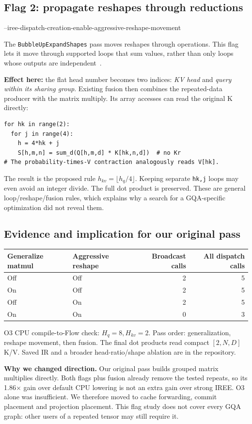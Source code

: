 \documentclass[10pt,a4paper]{article}
\newcommand{\code}[1]{\texttt{#1}}
\newcommand{\smallnote}[1]{{\footnotesize #1\par}}
\begin{document}
\subsection*{Flag 2: propagate reshapes through reductions}
{\footnotesize\ttfamily --iree-dispatch-creation-enable-aggressive-reshape-movement\par}
The \code{BubbleUpExpandShapes} pass moves reshapes through operations. This flag lets it move through supported loops that sum values, rather than only loops whose outputs are independent~\cite{ireesource,ireedocs}.

\textbf{Effect here:} the flat head number becomes two indices: \emph{KV head} and \emph{query within its sharing group}. Existing fusion then combines the repeated-data producer with the matrix multiply. Its array accesses can read the original K directly:
\begin{lstlisting}
for hk in range(2):
  for j in range(4):
    h = 4*hk + j
    S[h,m,n] = sum_d(Q[h,m,d] * K[hk,n,d])  # no Kr
# The probability-times-V contraction analogously reads V[hk].
\end{lstlisting}
The result is the proposed rule $h_{kv}=\lfloor h_q/4\rfloor$. Keeping separate \code{hk,j} loops may even avoid an integer divide. The full dot product is preserved. These are general loop/reshape/fusion rules, which explains why a search for a GQA-specific optimization did not reveal them.

\subsection*{Evidence and implication for our original pass}
{\small\begin{tabularx}{\linewidth}{@{}YYrr@{}}\toprule
Generalize matmul & Aggressive reshape & Broadcast calls & All dispatch calls\\\midrule
Off&Off&2&5\\On&Off&2&5\\Off&On&2&5\\On&On&0&3\\\bottomrule\end{tabularx}}
\smallnote{O3 CPU compile-to-Flow check: $H_q=8,H_{kv}=2$. Pass order: generalization, reshape movement, then fusion. The final dot products read compact $[2,N,D]$ K/V. Saved IR and a broader head-ratio/shape ablation are in the repository.}

\textbf{Why we changed direction.} Our original pass builds grouped matrix multiplies directly. Both flags plus fusion already remove the tested repeats, so its 1.86$\times$ gain over default CPU lowering is not an extra gain over strong IREE. O3 alone was insufficient. We therefore moved to cache forwarding, commit placement and projection placement. This flag study does not cover every GQA graph: other users of a repeated tensor may still require it.
\end{document}
